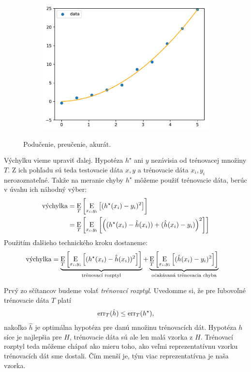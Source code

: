 \begin{figure}
\begin{subfigure}[b]{0.3\textwidth}
    \includegraphics[width=\linewidth]{obrazky/fitting2.pdf}
  \end{subfigure}
  \caption{Podučenie, preučenie, akurát.}
  \label{img:fitting}
\end{figure}

\medskip

Výchylku vieme upraviť ďalej. Hypotéza $h^\star$ ani $y$ nezávisia
od trénovacej množiny $T$. Z ich pohľadu sú teda testovacie dáta $x, y$
a trénovacie dáta $x_i, y_i$ nerozoznateľné. Takže na meranie chyby
$h^\star$ môžeme použiť trénovacie dáta, berúc v úvahu ich náhodný
výber:
\begin{align}
  \vychylka
    &= \E_T \left[ \E_{x_i, y_i} \left[ (h^\star(x_i) - y_i)^2 \right] \right] \\
    &= \E_T \left[ \E_{x_i, y_i} \left[ \left( (h^\star(x_i) - \hat{h}(x_i)) + (\hat{h}(x_i) - y_i) \right)^2 \right] \right]
\end{align}
Použitím ďalšieho technického kroku dostaneme:
\begin{align}
  \vychylka &= \underbrace{\E_T \left[ \E_{x_i, y_i} \left[ (h^\star(x_i) - \hat{h}(x_i))^2 \right] \right]}_\rozptylt
    + \underbrace{\E_T \left[ \E_{x_i, y_i} \left[ (\hat{h}(x_i) - y_i)^2 \right] \right]}_\chalgt
\end{align}

Prvý zo sčítancov budeme volať \emph{trénovací rozptyl}.
Uvedomme si, že pre ľubovoľné trénovacie dáta $T$ platí
$$\err_T(\hat{h}) \leq \err_T(h^\star),$$
nakoľko $\hat{h}$ je optimálna hypotéza pre danú množinu trénovacích
dát. Hypotéza $h$ síce je najlepšia pre $H$, trénovacie dáta sú ale len
malá vzorka z $H$.
Trénovací rozptyl teda môžeme chápať ako mieru toho, ako veľmi
reprezentatívnu vzorku trénovacích dát sme dostali. Čím menší je,
tým viac reprezentatívna je naša vzorka.

